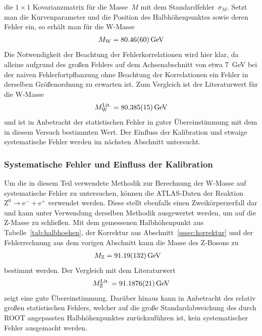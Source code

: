 \documentclass[11pt, a4paper]{article}
\numberwithin{equation}{section}
\begin{document}
die $1 \times 1$ Kovarianzmatrix für die Masse~$M$ mit dem Standardfehler~$\sigma_M$.
Setzt man die Kurvenparameter und die Position des Halbhöhenpunktes sowie deren Fehler ein, so erhält man für die W-Masse
\begin{align*}
	M_\mathrm{W} = \SI{80.46 +- 0.60}{\GeV}
\end{align*}
Die Notwendigkeit der Beachtung der Fehlerkorrelationen wird hier klar, da alleine aufgrund des großen Fehlers auf dem Achsenabschnitt von etwa \SI{7}{\GeV} bei der naiven Fehlerfortpflanzung ohne Beachtung der Korrelationen ein Fehler in derselben Größenordnung zu erwarten ist.
Zum Vergleich ist der Literaturwert für die W-Masse \cite{pdg}
\begin{align*}
	M_\mathrm{W}^\mathrm{Lit.} = \SI{80.385 +- 0.015}{\GeV}
\end{align*}
und ist in Anbetracht der statistischen Fehler in guter Übereinstimmung mit dem in diesem Versuch bestimmten Wert.
Der Einfluss der Kalibration und etwaige systematische Fehler werden im nächsten Abschnitt untersucht.

\subsubsection{Systematische Fehler und Einfluss der Kalibration}
Um die in diesem Teil verwendete Methodik zur Berechnung der W-Masse auf systematische Fehler zu untersuchen, können die ATLAS-Daten der Reaktion $\mathrm{Z}^0 \rightarrow \mathrm{e}^- + \mathrm{e}^+$ verwendet werden.
Diese stellt ebenfalls einen Zweikörperzerfall dar und kann unter Verwendung derselben Methodik ausgewertet werden, um auf die Z-Masse zu schließen.
Mit dem gemessenen Halbhöhenpunkt aus Tabelle~\ref{tab:halbhoehen}, der Korrektur aus Abschnitt~\ref{sssec:korrektur} und der Fehlerrechnung aus dem vorigen Abschnitt kann die Masse des Z-Bosons zu
\begin{align*}
	M_\mathrm{Z} &= \SI{91.19 +- 1.32}{\GeV}
\end{align*}
bestimmt werden.
Der Vergleich mit dem Literaturwert \cite{pdg}
\begin{align*}
	M_\mathrm{Z}^\mathrm{Lit.} = \SI{91.1876 +- 0.0021}{\GeV}
\end{align*}
zeigt eine gute Übereinstimmung.
Darüber hinaus kann in Anbetracht des relativ großen statistischen Fehlers, welcher auf die große Standardabweichung des durch ROOT angepassten Halbhöhenpunktes zurückzuführen ist, kein systematischer Fehler ausgemacht werden.
\end{document}

